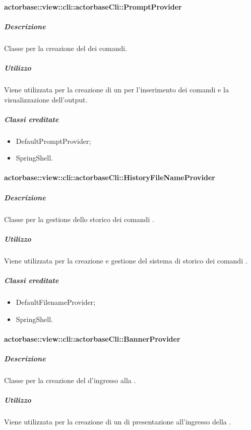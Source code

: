 \documentclass{scalatekids-article}
\begin{document}
\paragraph{actorbase::view::cli::actorbaseCli::PromptProvider}

\subparagraph{Descrizione}

Classe per la creazione del  dei comandi.

\subparagraph{Utilizzo}

Viene utilizzata per la creazione di un  per l'inserimento dei comandi e la visualizzazione dell'output.

\subparagraph{Classi ereditate}

\begin{itemize}
\item DefaultPromptProvider;
\item SpringShell.
\end{itemize}

\paragraph{actorbase::view::cli::actorbaseCli::HistoryFileNameProvider}

\subparagraph{Descrizione}

Classe per la gestione dello storico dei comandi .

\subparagraph{Utilizzo}

Viene utilizzata per la creazione e gestione del sistema di storico dei comandi .

\subparagraph{Classi ereditate}

\begin{itemize}
\item DefaultFilenameProvider;
\item SpringShell.
\end{itemize}

\paragraph{actorbase::view::cli::actorbaseCli::BannerProvider}

\subparagraph{Descrizione}

Classe per la creazione del  d'ingresso alla .

\subparagraph{Utilizzo}

Viene utilizzata per la creazione di un  di presentazione all'ingresso della .
\end{document}
